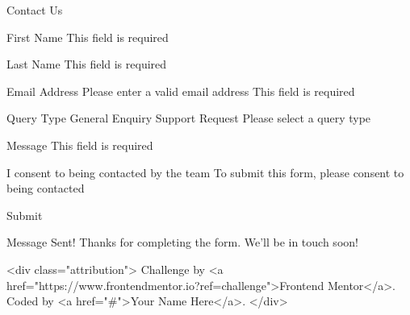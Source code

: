 Contact Us

  First Name
  This field is required

  Last Name
  This field is required

  Email Address
  Please enter a valid email address
  This field is required

  Query Type
  General Enquiry
  Support Request
  Please select a query type

  Message
  This field is required

  I consent to being contacted by the team
  To submit this form, please consent to being contacted

  Submit

  Message Sent!
  Thanks for completing the form. We'll be in touch soon!
  
  <div class="attribution">
    Challenge by <a href="https://www.frontendmentor.io?ref=challenge">Frontend Mentor</a>. 
    Coded by <a href="#">Your Name Here</a>.
  </div>
